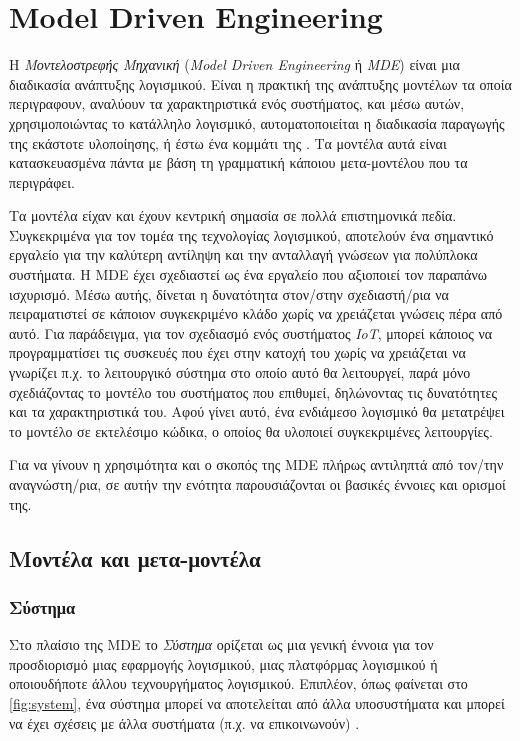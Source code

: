 \section{Model Driven Engineering}
\label{sec:theory_mde}

Η \textit{Μοντελοστρεφής Μηχανική} (\textit{Model Driven Engineering} ή \textit{MDE}) είναι μια διαδικασία ανάπτυξης λογισμικού. Είναι η πρακτική της ανάπτυξης μοντέλων τα οποία περιγραφουν, αναλύουν τα χαρακτηριστικά ενός συστήματος, και μέσω αυτών, χρησιμοποιώντας το κατάλληλο λογισμικό, αυτοματοποιείται η διαδικασία παραγωγής της εκάστοτε υλοποίησης, ή έστω ένα κομμάτι της \cite{bib:brambilla_2012}. Τα μοντέλα αυτά είναι κατασκευασμένα πάντα με βάση τη γραμματική κάποιου μετα-μοντέλου που τα περιγράφει.

Τα μοντέλα είχαν και έχουν κεντρική σημασία σε πολλά επιστημονικά πεδία. Συγκεκριμένα για τον τομέα της τεχνολογίας λογισμικού, αποτελούν ένα σημαντικό εργαλείο για την καλύτερη αντίληψη και την ανταλλαγή γνώσεων για πολύπλοκα συστήματα. Η MDE έχει σχεδιαστεί ως ένα εργαλείο που αξιοποιεί τον παραπάνω ισχυρισμό. Μέσω αυτής, δίνεται η δυνατότητα στον/στην σχεδιαστή/ρια να πειραματιστεί σε κάποιον συγκεκριμένο κλάδο χωρίς να χρειάζεται γνώσεις πέρα από αυτό. Για παράδειγμα, για τον σχεδιασμό ενός συστήματος \textit{IoT}, μπορεί κάποιος να προγραμματίσει τις συσκευές που έχει στην κατοχή του χωρίς να χρειάζεται να γνωρίζει π.χ. το λειτουργικό σύστημα στο οποίο αυτό θα λειτουργεί, παρά μόνο σχεδιάζοντας το μοντέλο του συστήματος που επιθυμεί, δηλώνοντας τις δυνατότητες και τα χαρακτηριστικά του. Αφού γίνει αυτό, ένα ενδιάμεσο λογισμικό θα μετατρέψει το μοντέλο σε εκτελέσιμο κώδικα, ο οποίος θα υλοποιεί συγκεκριμένες λειτουργίες.

Για να γίνουν η χρησιμότητα και ο σκοπός της MDE πλήρως αντιληπτά από τον/την αναγνώστη/ρια, σε αυτήν την ενότητα παρουσιάζονται οι βασικές έννοιες και ορισμοί της.

\subsection{Μοντέλα και μετα-μοντέλα}
\label{subsec:metamodels}

\subsubsection{Σύστημα}
\label{subsubsec:system}

Στο πλαίσιο της MDE το \textit{Σύστημα} ορίζεται ως μια γενική έννοια για τον προσδιορισμό μιας εφαρμογής λογισμικού, μιας πλατφόρμας λογισμικού ή οποιουδήποτε άλλου τεχνουργήματος λογισμικού. Επιπλέον, όπως φαίνεται στο \autoref{fig:system}, ένα σύστημα μπορεί να αποτελείται από άλλα υποσυστήματα και μπορεί να έχει σχέσεις με άλλα συστήματα (π.χ. να επικοινωνούν) \cite{bib:rodrigues_2015}.

